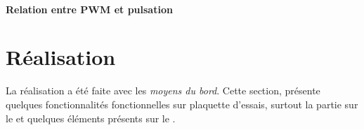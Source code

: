   			\paragraph{Relation entre PWM et pulsation}
	\section{Réalisation}\label{real}
			\begin{tcolorbox}[center,width=0.9\textwidth, colframe=red!90!orange, colback=orange!25, arc=3mm,boxrule=1mm, sharp corners=east,title=Note]
			La réalisation a été faite avec les \textit{moyens du bord}. Cette section, présente quelques fonctionnalités fonctionnelles sur plaquette d'essais, surtout la partie sur le \pic et quelques éléments présents sur le \dspic .
  			\end{tcolorbox}
  			
  			
